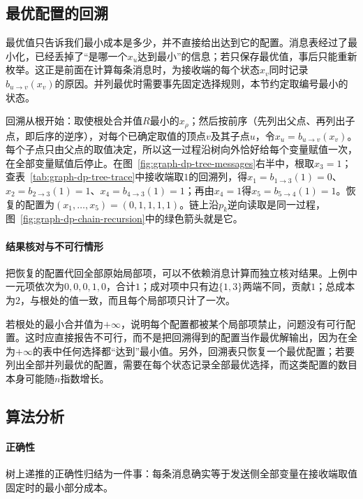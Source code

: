 \subsection{最优配置的回溯}
\label{sec:graph-dp-backtracking}

最优值只告诉我们最小成本是多少，并不直接给出达到它的配置。消息表经过了最小化，已经丢掉了“是哪一个$x_u$达到最小”的信息；若只保存最优值，事后只能重新枚举。这正是前面在计算每条消息时，为接收端的每个状态$x_v$同时记录$b_{u\to v}(x_v)$的原因。并列最优时需要事先固定选择规则，本节约定取编号最小的状态。

回溯从根开始：取使根处合并值$R$最小的$x_\rho$；然后按前序（先列出父点、再列出子点，即后序的逆序），对每个已确定取值的顶点$v$及其子点$u$，令$x_u=b_{u\to v}(x_v)$。每个子点只由父点的取值决定，所以这一过程沿树向外恰好给每个变量赋值一次，在全部变量赋值后停止。在图~\ref{fig:graph-dp-tree-messages}右半中，根取$x_3=1$；查表~\ref{tab:graph-dp-tree-trace}中接收端取$1$的回溯列，得$x_1=b_{1\to3}(1)=0$、$x_2=b_{2\to3}(1)=1$、$x_4=b_{4\to3}(1)=1$；再由$x_4=1$得$x_5=b_{5\to4}(1)=1$。恢复的配置为$(x_1,\ldots,x_5)=(0,1,1,1,1)$。链上沿$p_k$逆向读取是同一过程，图~\ref{fig:graph-dp-chain-recursion}中的绿色箭头就是它。

\paragraph{结果核对与不可行情形}
把恢复的配置代回全部原始局部项，可以不依赖消息计算而独立核对结果。上例中一元项依次为$0,0,0,1,0$，合计$1$；成对项中只有边$\{1,3\}$两端不同，贡献$1$；总成本为$2$，与根处的值一致，而且每个局部项只计了一次。

若根处的最小合并值为$+\infty$，说明每个配置都被某个局部项禁止，问题没有可行配置。这时应直接报告不可行，而不是把回溯得到的配置当作最优解输出，因为在全为$+\infty$的表中任何选择都“达到”最小值。另外，回溯表只恢复一个最优配置；若要列出全部并列最优的配置，需要在每个状态记录全部最优选择，而这类配置的数目本身可能随$n$指数增长。

\subsection{算法分析}
\label{sec:graph-dp-tree-analysis}

\paragraph{正确性}
树上递推的正确性归结为一件事：每条消息确实等于发送侧全部变量在接收端取值固定时的最小部分成本。

